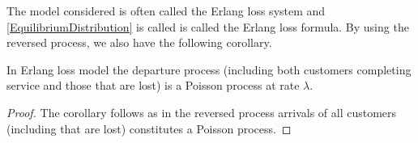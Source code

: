 \documentclass[a4paper,10pt,english]{article}
\begin{document}
The model considered is often called the Erlang loss system and \ref{EquilibriumDistribution} is called is called the Erlang loss formula. By using the reversed process, we also have the following corollary.
\begin{cor}
In Erlang loss model the departure process (including both customers completing service and those that are lost) is a Poisson process at rate $\lambda$. 
\end{cor}
\begin{proof}
The corollary follows as in the reversed process arrivals of all customers (including that are lost) constitutes a Poisson process. 
\end{proof}
\end{document}
